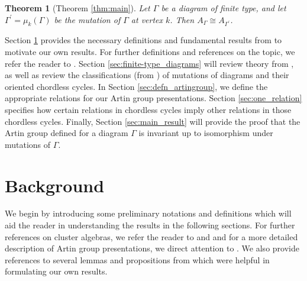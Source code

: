 \documentclass[11pt]{amsart}
\newtheorem{thm}{Theorem}[section]
\theoremstyle{definition}
\begin{document}
\begin{thm}[Theorem \ref{thm:main}]
Let $\Gamma$ be a diagram of finite type, and let $\Gamma^{\prime} = \mu_k(\Gamma)$ be the mutation of $\Gamma$ at vertex $k$. Then $A_{\Gamma} \cong A_{\Gamma^{\prime}}$.
\end{thm}


\indent Section \ref{sec:main_definitions} provides the necessary definitions and fundamental results from \cite{BM13} to motivate our own results. For further definitions and references on the topic, we refer the reader to \cite{FZ02}. Section \ref{sec:finite-type_diagrams} will review theory from \cite{FZ02}, \cite{FZ03} as well as review the classifications (from \cite{BM13}) of mutations of diagrams and their oriented chordless cycles. In Section \ref{sec:defn_artingroup}, we define the appropriate relations for our Artin group presentations. Section \ref{sec:one_relation} specifies how certain relations in chordless cycles imply other relations in those chordless cycles. Finally, Section \ref{sec:main_result} will provide the proof that the Artin group defined for a diagram $\Gamma$ is invariant up to isomorphism under mutations of $\Gamma$. \\

\section{Background}
\label{sec:main_definitions}

We begin by introducing some preliminary notations and definitions which will aid the reader in understanding the results in the following sections. For further references on cluster algebras, we refer the reader to \cite{FZ02} and \cite{FZ03} and for a more detailed description of Artin group presentations, we direct attention to \cite{FN61}. We also provide references to several lemmas and propositions from \cite{BM13} which were helpful in formulating our own results. \\
\end{document}
